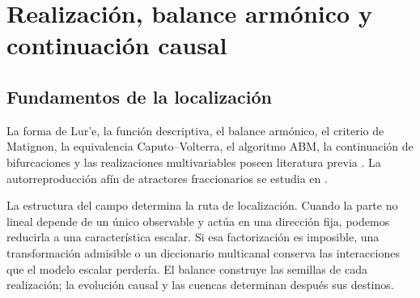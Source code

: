 \section{Realización, balance armónico y continuación causal}
\label{part:theory}

\subsection{Fundamentos de la localización}
\label{sec:theory-attribution}

La forma de Lur'e, la función descriptiva, el balance armónico, el criterio de
Matignon, la equivalencia Caputo--Volterra, el algoritmo ABM, la continuación
de bifurcaciones y las realizaciones multivariables poseen literatura previa
\cite{Leonov2013HiddenAttractors,LeonovKuznetsov2013,Matignon1996,
DiethelmFordFreed2002,bonani1999,rogov2019}. La autorreproducción afín de
atractores fraccionarios se estudia en \cite{sayed2020}.

La estructura del campo determina la ruta de localización. Cuando la parte
no lineal depende de un único observable y actúa en una dirección fija,
podemos reducirla a una característica escalar. Si esa factorización es
imposible, una transformación admisible o un diccionario multicanal conserva
las interacciones que el modelo escalar perdería. El balance construye las
semillas de cada realización; la evolución causal y las cuencas determinan
después sus destinos.

